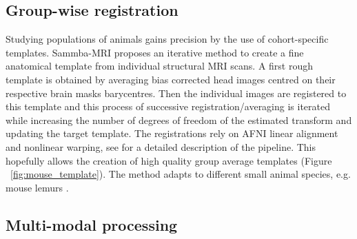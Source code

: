 \documentclass[utf8, a4paper, final, crop]{frontiersSCNS} %
\begin{document}
\subsection{Group-wise registration} %
%

Studying populations of animals gains precision by the use of cohort-specific 
templates. Sammba-MRI proposes an iterative method to create a fine anatomical 
template from individual structural MRI scans. A first rough template is obtained
by averaging bias corrected head images centred on their respective brain masks barycentres. Then the individual images are registered to this template
and this process of successive registration/averaging is iterated while increasing the number of degrees of 
freedom of the estimated transform and updating the target template. The registrations rely on AFNI linear 
alignment and nonlinear warping, see \citep{nadkarni20193d} for a detailed description of the pipeline. This hopefully allows the creation of high quality
group average templates (Figure ~\ref{fig:mouse_template}). The method adapts to different small animal species, e.g. mouse lemurs %
\citep{nadkarni2018digital}.

\subsection{Multi-modal processing}
\end{document}
